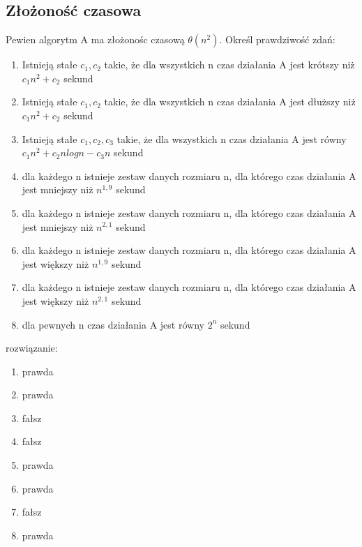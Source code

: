 \documentclass{article}
\begin{document}
\subsection*{Złożoność czasowa}
Pewien algorytm A ma złożonośc czasową $\theta(n^2)$. Określ prawdziwość zdań:
\begin{enumerate}
	\item Istnieją stałe $c_1, c_2$ takie, że dla wszystkich n czas działania A jest krótszy niż $c_1n^2 + c_2$ sekund
	\item Istnieją stałe $c_1, c_2$ takie, że dla wszystkich n czas działania A jest dłuższy niż $c_1n^2 + c_2$ sekund
	\item Istnieją stałe $c_1, c_2, c_3$ takie, że dla wszystkich n czas działania A jest równy $c_1n^2 + c_2nlogn -c_3n$ sekund
	\item dla każdego n istnieje zestaw danych rozmiaru n, dla którego czas działania A jest mniejszy niż $n^{1,9}$ sekund
	\item dla każdego n istnieje zestaw danych rozmiaru n, dla którego czas działania A jest mniejszy niż $n^{2,1}$ sekund
	\item dla każdego n istnieje zestaw danych rozmiaru n, dla którego czas działania A jest większy niż $n^{1,9}$ sekund
	\item dla każdego n istnieje zestaw danych rozmiaru n, dla którego czas działania A jest większy niż $n^{2,1}$ sekund
	\item dla pewnych n czas działania A jest równy $2^n$ sekund
\end{enumerate}
rozwiązanie:\\

\begin{enumerate}
	\item prawda
	\item prawda
	\item fałsz
	\item fałsz
	\item prawda
	\item prawda
	\item fałsz
	\item prawda
\end{enumerate}
\end{document}
